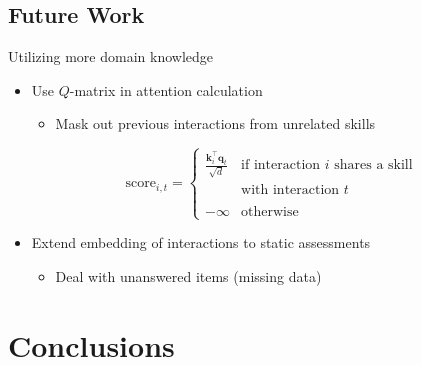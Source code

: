 \documentclass{beamer}
\newcommand{\vect}[1]{\boldsymbol{#1}}
\theoremstyle{definition}
\begin{document}
\subsection{Future Work}

\begin{frame}{Utilizing more domain knowledge}
  \begin{itemize}
    \item Use $Q$-matrix in attention calculation
      \begin{itemize}
        \item Mask out previous interactions from unrelated skills
      \end{itemize}
      \[\text{score}_{i,t} = \begin{cases}
        \displaystyle\frac{\vect k_i^\top \vect q_t}{\sqrt{d}} & \text{if interaction } i \text{ shares a skill}\\ & \text{with interaction } t \\
        & \\ 
        -\infty & \text{otherwise}
      \end{cases}\]
\item<2-> Extend embedding of interactions to static assessments
  \begin{itemize}
    \item Deal with unanswered items (missing data) 
  \end{itemize}
  \end{itemize}
\end{frame}


\section{Conclusions}
\end{document}
